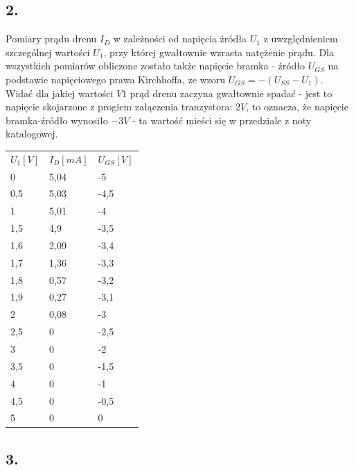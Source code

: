 \documentclass[polish,a4paper]{article}
\begin{document}
\subsection*{2.}

Pomiary prądu drenu $I_D$ w zależności od napięcia źródła $U_{1}$ z uwzględnieniem szczególnej wartości $U_{1}$, przy której gwałtownie wzrasta natężenie prądu. Dla wszystkich pomiarów obliczone zostało także napięcie bramka - źródło $U_{GS}$ na podstawie napięciowego prawa Kirchhoffa, ze wzoru $U_{GS}=-(U_{SS}-U_1)$.\\
Widać dla jakiej wartości $V1$ prąd drenu zaczyna gwałtownie spadać - jest to napięcie skojarzone z progiem załączenia tranzystora: $2V$, to oznacza, że napięcie bramka-źródło wynosiło $-3V$ - ta wartość mieści się w przedziale z noty katalogowej.

\begin{center}
\begin{tabular}{|l|l|l|}
\hline
\textbf{$U_1 [V]$} & \textbf{$I_D [mA]$} & \textbf{$U_{GS} [V]$}\\
\hhline{|=|=|=|}
0 & 5,04 & -5\\
\hline
0,5 & 5,03 & -4,5\\
\hline
1 & 5,01 & -4\\
\hline
1,5 & 4,9 & -3,5\\
\hline
1,6 & 2,09 & -3,4\\
\hline
1,7 & 1,36 & -3,3\\
\hline
1,8 & 0,57 & -3,2\\
\hline
1,9 & 0,27 & -3,1\\
\hline
2 & 0,08 & -3\\
\hline
2,5 & 0 & -2,5\\
\hline
3 & 0 & -2\\
\hline
3,5 & 0 & -1,5\\
\hline
4 & 0 & -1\\
\hline
4,5 & 0 & -0,5\\
\hline
5 & 0 & 0\\
\hline

\end{tabular}
\end{center}


\subsection*{3.} 
\end{document}
